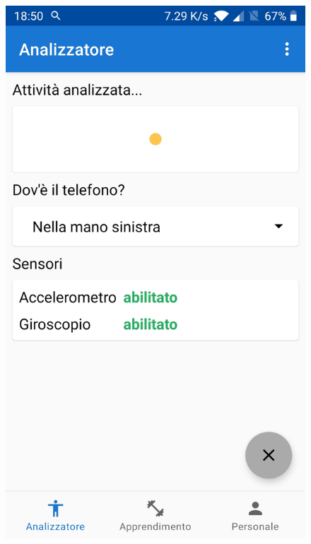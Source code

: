 \begin{figure}[H]
    \includegraphics[scale = 0.10]{assets/images/screenshots/1c_Analysis.jpg}

\end{figure}
